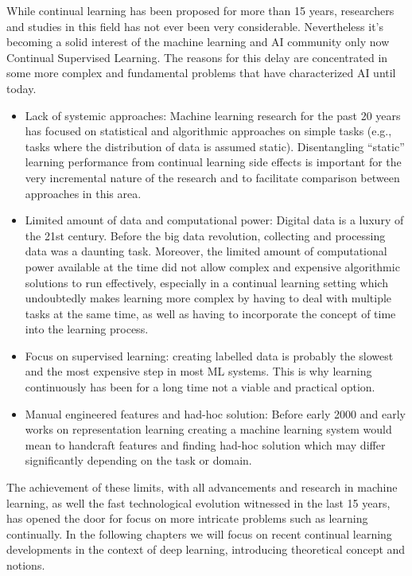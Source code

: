 \documentclass[english, LaM, oneside]{sapthesis}%
\begin{document}
\newline \newline
While continual learning has been proposed for more than 15 years, researchers and studies in this field has not ever been very considerable. Nevertheless it's becoming a solid interest of the machine learning and AI community only now
Continual Supervised Learning. The reasons for this delay are concentrated in some more complex and fundamental problems that have characterized AI until today.
\begin{itemize}
    \item Lack of systemic approaches: Machine learning research for the past 20 years has focused on statistical and algorithmic approaches on simple tasks (e.g., tasks where the distribution of data is assumed static). Disentangling “static” learning performance from continual learning side effects is important for the very incremental nature of the research and to facilitate comparison between approaches in this area.
    \item Limited amount of data and computational power: Digital data is a luxury of the 21st century. Before the big data revolution, collecting and processing data was a daunting task. Moreover, the limited amount of computational power available at the time did not allow complex and expensive algorithmic solutions to run effectively, especially in a continual learning setting which undoubtedly makes learning more complex by having to deal with multiple tasks at the same time, as well as having to incorporate the concept of time into the learning process.
    \item Focus on supervised learning: creating labelled data is probably the slowest and the most expensive step in most ML systems. This is why learning continuously has been for a long time not a viable and practical option.
    \item Manual engineered features and had-hoc solution: Before early 2000 and early works on representation learning creating a machine learning system would mean to handcraft features and finding had-hoc solution which may differ significantly depending on the task or domain.
\end{itemize}

The achievement of these limits, with all advancements and research in machine learning, as well the fast technological evolution witnessed in the last 15 years, has opened the door for focus on more intricate problems such as learning continually.
In the following chapters we will focus on recent continual learning developments in the context of deep learning, introducing theoretical concept and notions.
\end{document}
